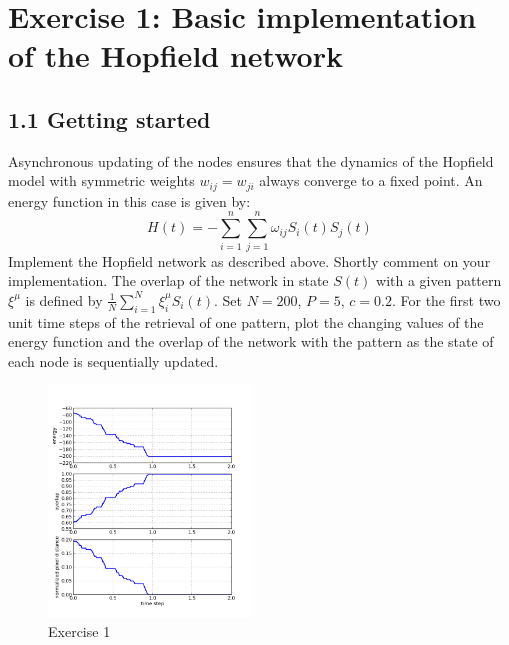 \section{Exercise 1: Basic implementation of the Hopfield network}
\subsection{1.1 Getting started}

\begin{itshape}
\small
Asynchronous updating of the nodes ensures that the dynamics of the Hopfield model with symmetric weights $w_{ij} = w_{ji}$ always converge to a fixed point. An energy function in this case is given by:
\begin{equation}
H(t)=-\sum_{i=1}^n \sum_{j=1}^n \omega_{ij} S_i(t) S_j(t)
\label{eq: energy function}
\end{equation}
Implement the Hopfield network as described above. Shortly comment on your implementation. The overlap of the network in state $S(t)$ with a given pattern $\xi^{\mu}$ is defined by $\frac{1}{N}\sum_{i=1}^N \xi_i^{\mu} 	S_i(t)$. Set $N = 200$, $P = 5$, $c = 0.2$. For the first two unit time steps of the retrieval of one pattern, plot the changing values of the energy function and the overlap of the network with the pattern as the state of each node is sequentially updated.
\end{itshape}

\begin{figure}
  \vspace{-20pt}
  \begin{center}
    \includegraphics[width=0.48\textwidth]{dat/ex1_1-energy_overlap-N200-P5-c20}
  \end{center}
  \vspace{-20pt}
  \caption{Exercise 1	}
  \label{fig: Question 1.1}
  \vspace{-10pt}
\end{figure}

